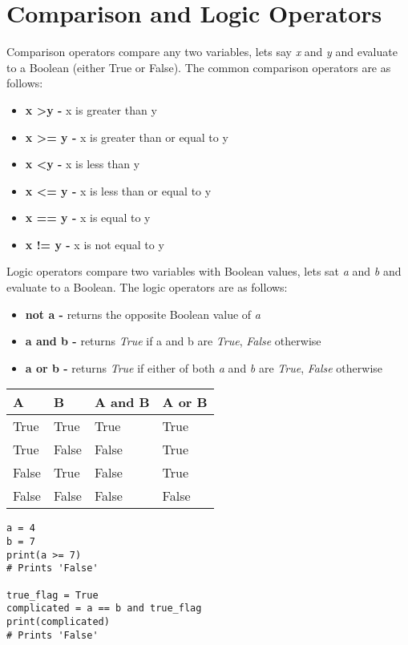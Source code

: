 \documentclass{article}
\begin{document}
\section{Comparison and Logic Operators}

Comparison operators compare any two variables, lets say \textit{x} and \textit{y} and evaluate to a Boolean (either True or False). The common comparison operators are as follows:

\begin{itemize}
\item \textbf{x \textgreater y -} x is greater than y
\item \textbf{x \textgreater= y -} x is greater than or equal to y
\item \textbf{x \textless y -} x is less than y
\item \textbf{x \textless= y -} x is less than or equal to y
\item \textbf{x == y -} x is equal to y
\item \textbf{x != y -} x is not equal to y
\end{itemize}

Logic operators compare two variables with Boolean values, lets sat \textit{a} and \textit{b} and evaluate to a Boolean. The logic operators are as follows:

\begin{itemize}
\item \textbf{not a -} returns the opposite Boolean value of \textit{a}
\item \textbf{a and b -} returns \textit{True} if a and b are \textit{True}, \textit{False} otherwise
\item \textbf{a or b -} returns \textit{True} if either of both \textit{a} and \textit{b} are \textit{True}, \textit{False} otherwise
\end{itemize} \medskip

\begin{center}
\begin{tabular}{l|l|l|l}
	A & B & A and B & A or B \\
	\hline
	True & True & True & True \\
	True & False & False & True \\
	False & True & False & True \\
	False & False & False & False
\end{tabular}
\end{center}

\begin{verbatim}
a = 4
b = 7
print(a >= 7)
# Prints 'False'

true_flag = True
complicated = a == b and true_flag
print(complicated)
# Prints 'False'
\end{verbatim}
\end{document}
